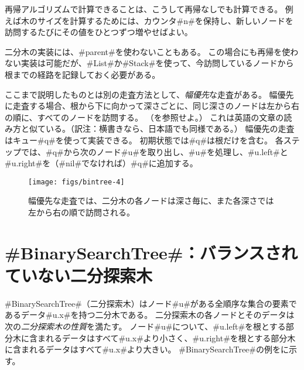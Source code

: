 再帰アルゴリズムで計算できることは、こうして再帰なしでも計算できる。
例えば木のサイズを計算するためには、カウンタ#n#を保持し、新しいノードを訪問するたびにその値をひとつずつ増やせばよい。

二分木の実装には、#parent#を使わないこともある。
この場合にも再帰を使わない実装は可能だが、#List#か#Stack#を使って、今訪問しているノードから根までの経路を記録しておく必要がある。

ここまで説明したものとは別の走査方法として、\emph{幅優先}な走査がある。
%
%
幅優先に走査する場合、根から下に向かって深さごとに、同じ深さのノードは左から右の順に、すべてのノードを訪問する。
（を参照せよ。）
これは英語の文章の読み方と似ている。（訳注：横書きなら、日本語でも同様である。）
幅優先の走査はキュー#q#を使って実装できる。
初期状態では#q#は根だけを含む。
各ステップでは、#q#から次のノード#u#を取り出し、#u#を処理し、#u.left#と#u.right#を（#nil#でなければ）#q#に追加する。

\begin{figure}
  \begin{center}
    \texttt{[image: figs/bintree-4]}
  \end{center}
  \caption{幅優先な走査では、二分木の各ノードは深さ毎に、また各深さでは左から右の順で訪問される。}
\end{figure}

\section{#BinarySearchTree#：バランスされていない二分探索木}

%
%
%
#BinarySearchTree#（二分探索木）はノード#u#がある全順序な集合の要素であるデータ#u.x#を持つ二分木である。
二分探索木の各ノードとそのデータは次の\emph{二分探索木の性質}を満たす。 %
%
ノード#u#について、#u.left#を根とする部分木に含まれるデータはすべて#u.x#より小さく、#u.right#を根とする部分木に含まれるデータはすべて#u.x#より大きい。
#BinarySearchTree#の例をに示す。

